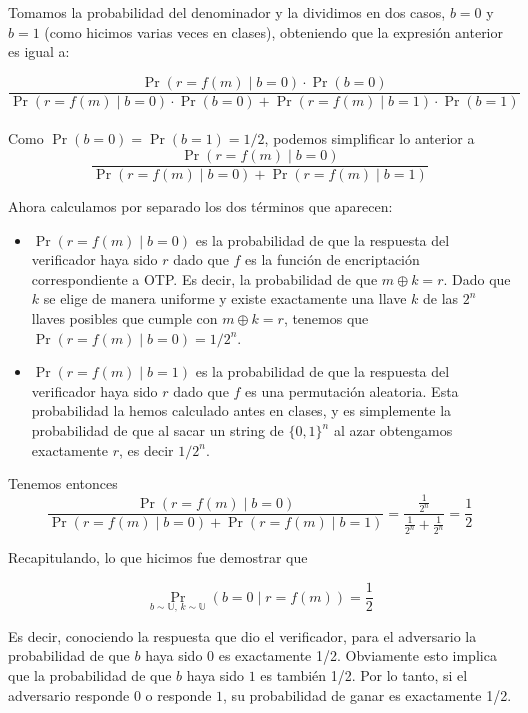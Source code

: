 \documentclass[11pt]{article}
\begin{document}
Tomamos la probabilidad del denominador y la dividimos en dos casos, $b=0$ y $b=1$ (como hicimos varias veces en clases), obteniendo que la expresión anterior es igual a:

$$\frac{
  \Pr(r=f(m)\mid b=0)\cdot\Pr(b=0)
  }{
    \Pr(r=f(m)\mid b=0)\cdot\Pr(b=0)+\Pr(r=f(m)\mid b=1)\cdot\Pr(b=1)
}
$$
\\

Como $\Pr(b=0)=\Pr(b=1)=1/2$, podemos simplificar lo anterior a
$$\frac{
  \Pr(r=f(m)\mid b=0)
  }{
    \Pr(r=f(m)\mid b=0)+\Pr(r=f(m)\mid b=1)
}
$$

Ahora calculamos por separado los dos términos que aparecen:

\begin{itemize}
  \item $\Pr(r=f(m)\mid b=0)$ es la probabilidad de que la respuesta del verificador haya sido $r$ dado que $f$ es la función de encriptación correspondiente a OTP. Es decir, la probabilidad de que $m\oplus k=r$. Dado que $k$ se elige de manera uniforme y existe exactamente una llave $k$ de las $2^n$ llaves posibles que cumple con $m\oplus k=r$, tenemos que $\Pr(r=f(m)\mid b=0)=1/2^n$.
  \item $\Pr(r=f(m)\mid b=1)$ es la probabilidad de que la respuesta del verificador haya sido $r$ dado que $f$ es una permutación aleatoria. Esta probabilidad la hemos calculado antes en clases, y es simplemente la probabilidad de que al sacar un string de $\{0,1\}^n$ al azar obtengamos exactamente $r$, es decir $1/2^n$.
\end{itemize}

Tenemos entonces
$$\frac{
  \Pr(r=f(m)\mid b=0)
  }{
    \Pr(r=f(m)\mid b=0)+\Pr(r=f(m)\mid b=1)
}=\frac{
  \frac{1}{2^n}
}{
  \frac{1}{2^n}+\frac{1}{2^n}
}=\frac{1}{2}
$$

Recapitulando, lo que hicimos fue demostrar que 

$$\Pr_{b\sim \mathbb{U},\, k\sim \mathbb{U}}(b=0\mid r=f(m))= \frac{1}{2}$$

Es decir, conociendo la respuesta que dio el verificador, para el adversario la probabilidad de que $b$ haya sido $0$ es exactamente 1/2. Obviamente esto implica que la probabilidad de que $b$ haya sido $1$ es también 1/2. Por lo tanto, si el adversario responde $0$ o responde $1$, su probabilidad de ganar es exactamente 1/2.
\end{document}
